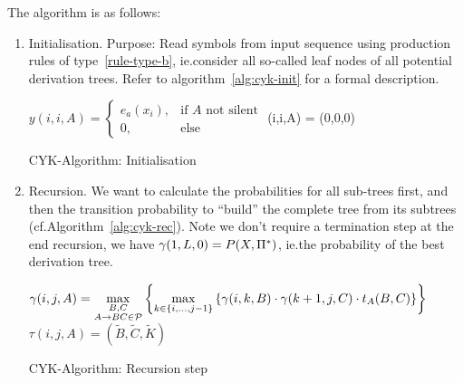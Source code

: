 The algorithm is as follows:
\begin{enumerate}[label=(\alph*)]
\item Initialisation.  Purpose: Read symbols from input sequence using
  production rules of type~\ref{rule-type-b}, ie.\@ consider all so-called leaf
  nodes of all potential derivation trees.  Refer to
  algorithm~\ref{alg:cyk-init} for a formal description.

\AlgoDisplayBlockMarkers\SetAlgoNoLine%
\begin{algorithm}[ht]
 {
     {
        $y(i,i,A) = \begin{cases} e_a(x_i), &\text{if \(A\) not silent}\\ 0, &\text{else} \end{cases}$ \;
        \tau(i,i,A) = (0,0,0) 
    }
}
\label{alg:cyk-init}
\caption{CYK-Algorithm: Initialisation}
\end{algorithm}

\item Recursion.  We want to calculate the probabilities for all sub-trees
  first, and then the transition probability to \enquote{build} the complete
  tree from its subtrees (cf.\@ Algorithm~\ref{alg:cyk-rec}).  Note we don't
  require a termination step at the end recursion, we have
  \(\gamma(1,L,0)=P(X,\Pi^*)\), ie.\@ the probability of the best derivation
  tree.

\AlgoDisplayBlockMarkers\SetAlgoNoLine%
\begin{algorithm}[ht]
 {
     {
         {
            $\gamma(i,j,A) = \max\limits_{\substack{B,C\\A\to BC\in\mathcal{P}}}
                \left\{ \max\limits_{k\in\{i,\dotsc,j-1\}}
                \left\{ \gamma(i,k,B) \cdot \gamma(k+1,j,C) \cdot t_A(B,C) \right\} \right\} $\;
            $\tau(i,j,A) = (\widetilde{B},\widetilde{C},\widetilde{K})$
        }
    }
}
\label{alg:cyk-rec}
\caption{CYK-Algorithm: Recursion step}
\end{algorithm}

\end{enumerate}

